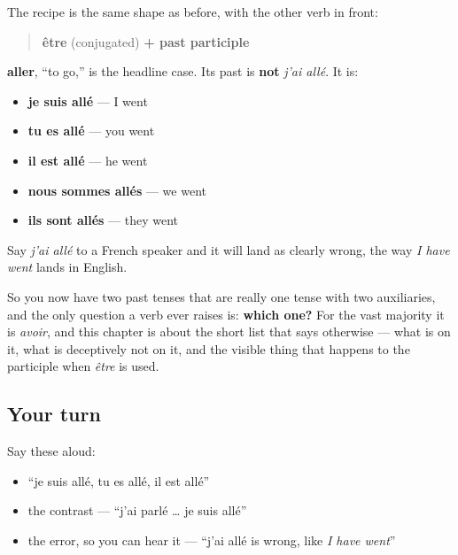\begin{grammarlens}[title={Grammar Lens: some verbs take être instead}]
The recipe is the same shape as before, with the other verb in front:

\begin{quote}
\textbf{être} (conjugated) \textbf{+ past participle}
\end{quote}

\textbf{aller}, \textquotedblleft{}to go,\textquotedblright{} is the headline case. Its past is \textbf{not} \emph{j'ai allé}. It is:

\begin{itemize}
\raggedright
  \item \textbf{je suis allé} — I went
  \item \textbf{tu es allé} — you went
  \item \textbf{il est allé} — he went
  \item \textbf{nous sommes allés} — we went
  \item \textbf{ils sont allés} — they went
\end{itemize}

Say \emph{j'ai allé} to a French speaker and it will land as clearly wrong, the way \emph{I have went} lands in English.

So you now have two past tenses that are really one tense with two auxiliaries, and the only question a verb ever raises is: \textbf{which one?} For the vast majority it is \emph{avoir}, and this chapter is about the short list that says otherwise — what is on it, what is deceptively not on it, and the visible thing that happens to the participle when \emph{être} is used.
\end{grammarlens}

\subsection*{Your turn}
Say these aloud:

\begin{itemize}
\raggedright
  \item \textquotedblleft{}je suis allé, tu es allé, il est allé\textquotedblright{}
  \item the contrast — \textquotedblleft{}j'ai parlé … je suis allé\textquotedblright{}
  \item the error, so you can hear it — \textquotedblleft{}j'ai allé is wrong, like \emph{I have went}\textquotedblright{}
\end{itemize}

